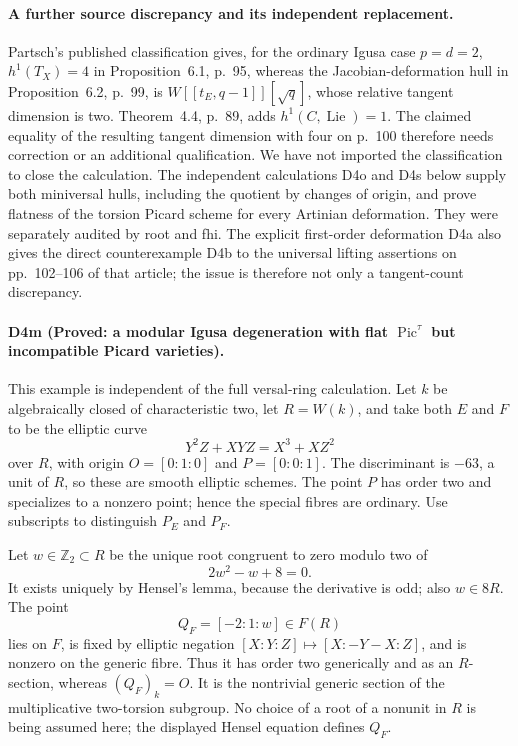 \paragraph{A further source discrepancy and its independent replacement.}
Partsch's published classification \cite{DGJ_Partsch2013} gives, for the ordinary Igusa
case $p=d=2$, $h^1(T_X)=4$ in Proposition~6.1, p.~95,
whereas the Jacobian-deformation hull in Proposition~6.2, p.~99,
is $W[[t_E,q-1]][\sqrt q]$, whose relative tangent dimension is
two.  Theorem~4.4, p.~89, adds $h^1(C,\operatorname{Lie})=1$.
The claimed equality of the resulting tangent dimension with
four on p.~100 therefore needs correction or an additional
qualification.  We have not imported the classification to
close the calculation. The independent calculations D4o and D4s below
supply both miniversal hulls, including the quotient by changes of origin,
and prove flatness of the torsion Picard scheme for every Artinian
deformation. They were separately audited by root and fhi.
The explicit first-order deformation D4a also gives the direct
counterexample D4b to the universal lifting assertions on
pp.~102--106 of that article; the issue is therefore not only a
tangent-count discrepancy.

\paragraph{D4m (Proved: a modular Igusa degeneration with flat
$\operatorname{Pic}^{\tau}$ but incompatible Picard varieties).}
This example is independent of the full versal-ring calculation.
Let $k$ be algebraically closed of characteristic two, let $R=W(k)$,
and take both $E$ and $F$ to be the elliptic curve
\[
 Y^2Z+XYZ=X^3+XZ^2
\]
over $R$, with origin $O=[0:1:0]$ and $P=[0:0:1]$.
The discriminant is $-63$, a unit of $R$, so these are smooth elliptic
schemes. The point $P$ has order two and specializes to a nonzero
point; hence the special fibres are ordinary. Use subscripts to
distinguish $P_E$ and $P_F$.

Let $w\in\mathbb Z_2\subset R$ be the unique root congruent to zero
modulo two of
\[
 2w^2-w+8=0.
\]
It exists uniquely by Hensel's lemma, because the derivative is odd;
also $w\in8R$. The point
\[
 Q_F=[-2:1:w]\in F(R)
\]
lies on $F$, is fixed by elliptic negation
$[X:Y:Z]\mapsto[X:-Y-X:Z]$, and is nonzero on the generic fibre.
Thus it has order two generically and as an $R$-section, whereas
$(Q_F)_k=O$. It is the nontrivial generic section of the multiplicative
two-torsion subgroup. No choice of a root of a nonunit in $R$ is
being assumed here; the displayed Hensel equation defines $Q_F$.

